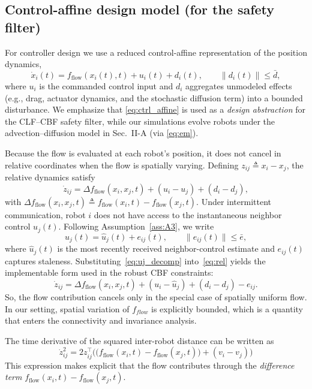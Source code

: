 \documentclass[conference]{IEEEconf}
\theoremstyle{plain}
\begin{document}
\subsection{Control-affine design model (for the safety filter)}
For controller design we use a reduced control-affine representation of the position dynamics,
\begin{equation}
\dot x_i(t)=f_{\mathrm{flow}}(x_i(t),t)+u_i(t)+d_i(t),\qquad \|d_i(t)\|\le \bar d,
\label{eq:ctrl_affine}
\end{equation}
where $u_i$ is the commanded control input and $d_i$ aggregates unmodeled effects (e.g., drag, actuator dynamics, and the stochastic diffusion term) into a bounded disturbance.
We emphasize that \eqref{eq:ctrl_affine} is used as a \emph{design abstraction} for the CLF--CBF safety filter, while our simulations evolve robots under the advection--diffusion model in Sec.~II-A (via \eqref{eq:em}).

Because the flow is evaluated at each robot's position, it does not cancel in relative coordinates when the flow is spatially varying. Defining $z_{ij}\triangleq x_i-x_j$, the relative dynamics satisfy
\begin{equation}
\dot z_{ij}=\Delta f_{\mathrm{flow}}(x_i,x_j,t)+(u_i-u_j)+(d_i-d_j),
\label{eq:rel}
\end{equation}
with $\Delta f_{\mathrm{flow}}(x_i,x_j,t)\triangleq f_{\mathrm{flow}}(x_i,t)-f_{\mathrm{flow}}(x_j,t)$.
Under intermittent communication, robot $i$ does not have access to the instantaneous neighbor control $u_j(t)$. Following Assumption~\ref{ass:A3}, we write
\begin{equation}
u_j(t) = \hat u_j(t) + e_{ij}(t), \qquad \|e_{ij}(t)\|\le \bar e,
\label{eq:uj_decomp}
\end{equation}
where $\hat u_j(t)$ is the most recently received neighbor-control estimate and $e_{ij}(t)$ captures staleness. Substituting~\eqref{eq:uj_decomp} into~\eqref{eq:rel} yields the implementable form used in the robust CBF constraints:
\begin{equation}
\dot z_{ij}
= \Delta f_{\mathrm{flow}}(x_i,x_j,t)
+ (u_i-\hat u_j) + (d_i-d_j) - e_{ij}.
\label{eq:relative_dyn_impl}
\end{equation}
So, the flow contribution cancels only in the special case of spatially uniform flow. In our setting, spatial variation of $f_{flow}$ is explicitly bounded, which is a quantity that enters the connectivity and invariance analysis.

The time derivative of the squared inter-robot distance can be written as
\begin{equation*}
    \dot{z}_{ij}^2 = 2{z}_{ij}^\top \Big( \big( f_{\text{flow}}(x_i,t) - f_{\text{flow}}(x_j,t) \big) + (v_i - v_j) \Big)
\end{equation*}
This expression makes explicit that the flow contributes through the \textit{difference term} $f_{\text{flow}}(x_i,t)-f_{\text{flow}}(x_j,t)$.
\end{document}
